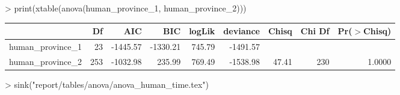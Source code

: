 
>   print(xtable(anova(human_province_1, human_province_2)))
\begin{table}[ht]
\centering
\begin{tabular}{lrrrrrrrr}
  \hline
 & Df & AIC & BIC & logLik & deviance & Chisq & Chi Df & Pr($>$Chisq) \\ 
  \hline
human\_province\_1 & 23 & -1445.57 & -1330.21 & 745.79 & -1491.57 &  &  &  \\ 
  human\_province\_2 & 253 & -1032.98 & 235.99 & 769.49 & -1538.98 & 47.41 & 230 & 1.0000 \\ 
   \hline
\end{tabular}
\end{table}

>   sink("report/tables/anova/anova_human_time.tex")
